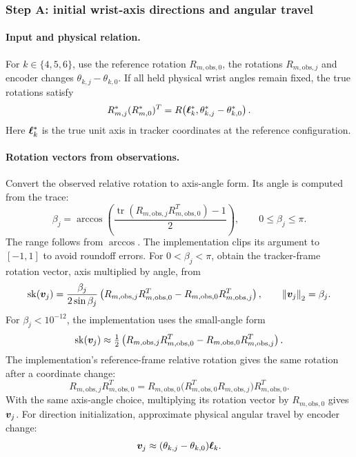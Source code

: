 \documentclass[../main.tex]{subfiles}
\begin{document}
\subsubsection{Step A: initial wrist-axis directions and angular travel}\label{sec:math-stepA}
\paragraph{Input and physical relation.}
For $k\in\{4,5,6\}$, use the reference rotation $R_{m,\mathrm{obs},0}$, the rotations $R_{m,\mathrm{obs},j}$ and encoder changes $\theta_{k,j}-\theta_{k,0}$. If all held physical wrist angles remain fixed, the true rotations satisfy
\begin{equation}\label{eq:wrist-turn}
R_{m,j}^*(R_{m,0}^*)^T
=R\!\left(\bm{\ell}_k^*,\theta_{k,j}^*-\theta_{k,0}^*\right).
\end{equation}
Here $\bm{\ell}_k^*$ is the true unit axis in tracker coordinates at the reference configuration.

\paragraph{Rotation vectors from observations.}
Convert the observed relative rotation to axis-angle form. Its angle is computed from the trace:
\begin{equation*}
\beta_j=\arccos\!\left(
\frac{\operatorname{tr}(R_{m,\mathrm{obs},j}R_{m,\mathrm{obs},0}^T)-1}{2}\right),
\qquad 0\leq\beta_j\leq\pi.
\end{equation*}
The range follows from $\arccos$. The implementation clips its argument to $[-1,1]$ to avoid roundoff errors. For $0<\beta_j<\pi$, obtain the tracker-frame rotation vector, axis multiplied by angle, from
\begin{equation*}
\operatorname{sk}(\bm{v}_j)=\frac{\beta_j}{2\sin\beta_j}
\left(R_{m,\mathrm{obs},j}R_{m,\mathrm{obs},0}^T
-R_{m,\mathrm{obs},0}R_{m,\mathrm{obs},j}^T\right),
\qquad\left\|\bm{v}_j\right\|_2=\beta_j.
\end{equation*}
For $\beta_j<10^{-12}$, the implementation uses the small-angle form
\begin{equation*}
\operatorname{sk}(\bm{v}_j)\approx\tfrac12
\left(R_{m,\mathrm{obs},j}R_{m,\mathrm{obs},0}^T
-R_{m,\mathrm{obs},0}R_{m,\mathrm{obs},j}^T\right).
\end{equation*}
The implementation's reference-frame relative rotation gives the same rotation after a coordinate change:
\begin{equation*}
R_{m,\mathrm{obs},j}R_{m,\mathrm{obs},0}^T
=R_{m,\mathrm{obs},0}\bigl(R_{m,\mathrm{obs},0}^TR_{m,\mathrm{obs},j}\bigr)R_{m,\mathrm{obs},0}^T.
\end{equation*}
With the same axis-angle choice, multiplying its rotation vector by $R_{m,\mathrm{obs},0}$ gives $\bm{v}_j$. For direction initialization, approximate physical angular travel by encoder change:
\begin{equation*}
\bm{v}_j\approx(\theta_{k,j}-\theta_{k,0})\bm{\ell}_k.
\end{equation*}
\end{document}
